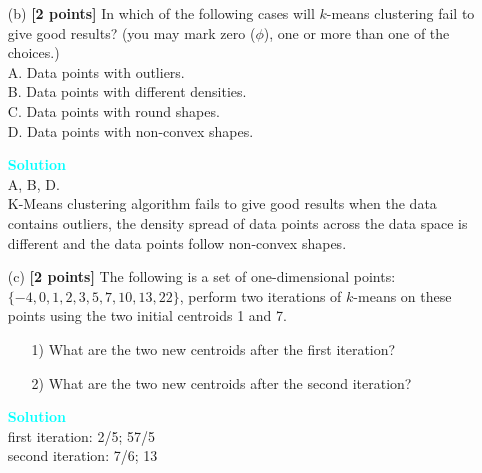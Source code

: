 \documentclass[10pt]{article}
\newenvironment{solution}
    { \begin{mdframed}[backgroundcolor=gray!10] \textcolor{cyan}{\textbf{Solution}} \\}
    {  \end{mdframed}}
\begin{document}
\begin{enumerate}
\begin{itemize}
\begin{solution}
			            This condition limits the runtime of the clustering algorithm, but in some cases the quality of the clustering will be poor because of an insufficient number of iterations.
			            Except for cases with a bad local minimum, this produces a good clustering, but runtimes may be unacceptably long.
			            This also ensures that the algorithm has converged at the minima.
			            Terminate when the objective value falls below a threshold. This criterion ensures that the clustering is of a desired quality after termination. 
						Practically, it’s a good practice to combine it with a bound on the number of iterations to guarantee termination.
		            \end{solution}


		      \item[(b)] \textbf{[2 points]}
		            In which of the following cases will $k$-means clustering fail to give good results?
		            (you may mark zero ($\phi$), one or more than one of the choices.)\\
		            A. Data points with outliers.\\
		            B. Data points with different densities.\\
		            C. Data points with round shapes.\\
		            D. Data points with non-convex shapes.
		            \begin{solution}
			            A, B, D.\\
			            K-Means clustering algorithm fails to give good results when the data contains outliers, the density spread of data points across the data space is different and the data points follow non-convex shapes.
		            \end{solution}

		      \item[(c)] \textbf{[2 points]}
		            The following is a set of one-dimensional points: $\{-4, 0, 1, 2, 3, 5, 7, 10, 13, 22\}$, perform two iterations of $k$-means on these points using the two initial centroids 1 and 7.
		            \begin{itemize}
			            \item[1)] What are the two new centroids after the first iteration?
			            \item[2)] What are the two new centroids after the second iteration?
		            \end{itemize}
		            \begin{solution}
			            first iteration: 2/5; 57/5\\
			            second iteration: 7/6; 13
		            \end{solution}
	      \end{itemize}




\end{enumerate}
\end{document}
